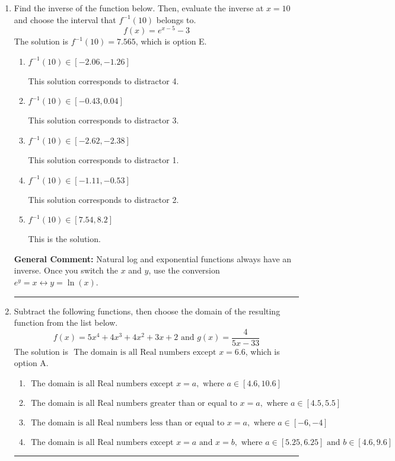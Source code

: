 \documentclass{extbook}[14pt]
\newcommand{\litem}[1]{\item #1

\rule{\textwidth}{0.4pt}}
\begin{document}
\begin{enumerate}\litem{
Find the inverse of the function below. Then, evaluate the inverse at $x = 10$ and choose the interval that $f^{-1}(10)$ belongs to.
\[ f(x) = e^{x-5}-3 \]
The solution is \( f^{-1}(10) = 7.565 \), which is option E.\begin{enumerate}[label=\Alph*.]
\item \( f^{-1}(10) \in [-2.06, -1.26] \)

 This solution corresponds to distractor 4.
\item \( f^{-1}(10) \in [-0.43, 0.04] \)

 This solution corresponds to distractor 3.
\item \( f^{-1}(10) \in [-2.62, -2.38] \)

 This solution corresponds to distractor 1.
\item \( f^{-1}(10) \in [-1.11, -0.53] \)

 This solution corresponds to distractor 2.
\item \( f^{-1}(10) \in [7.54, 8.2] \)

 This is the solution.
\end{enumerate}

\textbf{General Comment:} Natural log and exponential functions always have an inverse. Once you switch the $x$ and $y$, use the conversion $ e^y = x \leftrightarrow y=\ln(x)$.
}
\litem{
Subtract the following functions, then choose the domain of the resulting function from the list below.
\[ f(x) = 5x^{4} +4 x^{3} +4 x^{2} +3 x + 2 \text{ and } g(x) = \frac{4}{5x-33} \]
The solution is \( \text{ The domain is all Real numbers except } x = 6.6 \), which is option A.\begin{enumerate}[label=\Alph*.]
\item \( \text{ The domain is all Real numbers except } x = a, \text{ where } a \in [4.6, 10.6] \)


\item \( \text{ The domain is all Real numbers greater than or equal to } x = a, \text{ where } a \in [4.5, 5.5] \)


\item \( \text{ The domain is all Real numbers less than or equal to } x = a, \text{ where } a \in [-6, -4] \)


\item \( \text{ The domain is all Real numbers except } x = a \text{ and } x = b, \text{ where } a \in [5.25, 6.25] \text{ and } b \in [4.6, 9.6] \)



\end{enumerate}}
\end{enumerate}
\end{document}
